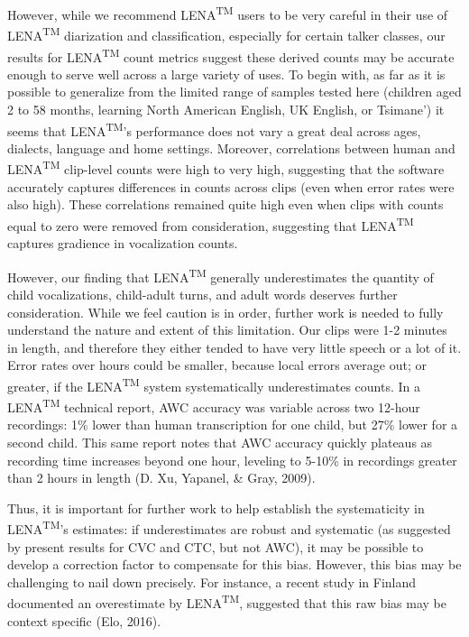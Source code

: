 \documentclass[english,floatsintext,man]{apa6}
\begin{document}
However, while we recommend LENA\textsuperscript{TM} users to be very
careful in their use of LENA\textsuperscript{TM} diarization and
classification, especially for certain talker classes, our results for
LENA\textsuperscript{TM} count metrics suggest these derived counts may
be accurate enough to serve well across a large variety of uses. To
begin with, as far as it is possible to generalize from the limited
range of samples tested here (children aged 2 to 58 months, learning
North American English, UK English, or Tsimane') it seems that
LENA\textsuperscript{TM}'s performance does not vary a great deal across
ages, dialects, language and home settings. Moreover, correlations
between human and LENA\textsuperscript{TM} clip-level counts were high
to very high, suggesting that the software accurately captures
differences in counts across clips (even when error rates were also
high). These correlations remained quite high even when clips with
counts equal to zero were removed from consideration, suggesting that
LENA\textsuperscript{TM} captures gradience in vocalization counts.

However, our finding that LENA\textsuperscript{TM} generally
underestimates the quantity of child vocalizations, child-adult turns,
and adult words deserves further consideration. While we feel caution is
in order, further work is needed to fully understand the nature and
extent of this limitation. Our clips were 1-2 minutes in length, and
therefore they either tended to have very little speech or a lot of it.
Error rates over hours could be smaller, because local errors average
out; or greater, if the LENA\textsuperscript{TM} system systematically
underestimates counts. In a LENA\textsuperscript{TM} technical report,
AWC accuracy was variable across two 12-hour recordings: 1\% lower than
human transcription for one child, but 27\% lower for a second child.
This same report notes that AWC accuracy quickly plateaus as recording
time increases beyond one hour, leveling to 5-10\% in recordings greater
than 2 hours in length (D. Xu, Yapanel, \& Gray, 2009).

Thus, it is important for further work to help establish the
systematicity in LENA\textsuperscript{TM}'s estimates: if underestimates
are robust and systematic (as suggested by present results for CVC and
CTC, but not AWC), it may be possible to develop a correction factor to
compensate for this bias. However, this bias may be challenging to nail
down precisely. For instance, a recent study in Finland documented an
overestimate by LENA\textsuperscript{TM}, suggested that this raw bias
may be context specific (Elo, 2016).
\end{document}
